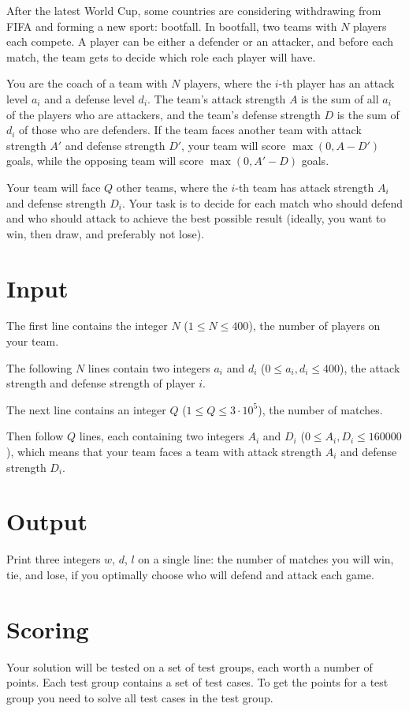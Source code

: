 
After the latest World Cup, some countries are considering withdrawing from FIFA and forming a new sport: bootfall. 
In bootfall, two teams with $N$ players each compete. A player can be either a defender or an attacker, 
and before each match, the team gets to decide which role each player will have.

You are the coach of a team with $N$ players, where the $i$-th player has an attack level $a_i$ and a defense level $d_i$. 
The team's attack strength $A$ is the sum of all $a_i$ of the players who are attackers, 
and the team's defense strength $D$ is the sum of $d_i$ of those who are defenders. 
If the team faces another team with attack strength $A'$ and defense strength $D'$, 
your team will score $\max(0, A-D')$ goals, while the opposing team will score $\max(0, A'-D)$ goals.

Your team will face $Q$ other teams, where the $i$-th team has attack strength $A_i$ and defense strength $D_i$. 
Your task is to decide for each match who should defend and who should attack to achieve the best possible
result (ideally, you want to win, then draw, and preferably not lose).


\section*{Input}
The first line contains the integer $N$ ($1 \leq N \leq 400$), the number of players on your team.

The following $N$ lines contain two integers $a_i$ and $d_i$ ($0 \leq a_i, d_i \leq 400$), the attack
strength and defense strength of player $i$.

The next line contains an integer $Q$ ($1 \leq Q \leq 3 \cdot 10^5$), the number of matches.

Then follow $Q$ lines, each containing two integers $A_i$ and $D_i$ ($0 \leq A_i, D_i \leq 160000$),
which means that your team faces a team with attack strength $A_i$ and defense strength $D_i$.

\section*{Output}
Print three integers $w$, $d$, $l$ on a single line: the number of matches you will win, tie, and lose,
if you optimally choose who will defend and attack each game.

\section*{Scoring}
Your solution will be tested on a set of test groups, each worth a number of points. Each test group contains
a set of test cases. To get the points for a test group you need to solve all test cases in the test group.

